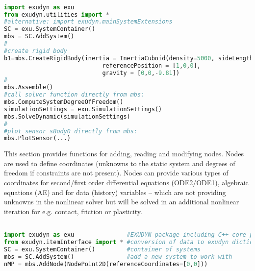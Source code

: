 \pythonstyle
\begin{lstlisting}[language=Python, firstnumber=1]

import exudyn as exu           
from exudyn.utilities import * 
#alternative: import exudyn.mainSystemExtensions
SC = exu.SystemContainer()
mbs = SC.AddSystem()
#
#create rigid body
b1=mbs.CreateRigidBody(inertia = InertiaCuboid(density=5000, sideLengths=[0.1,0.1,1]),
                            referencePosition = [1,0,0], 
                            gravity = [0,0,-9.81])
#
mbs.Assemble()
#call solver function directly from mbs:
mbs.ComputeSystemDegreeOfFreedom()
simulationSettings = exu.SimulationSettings()
mbs.SolveDynamic(simulationSettings)
#
#plot sensor sBody0 directly from mbs:
mbs.PlotSensor(...)
\end{lstlisting}




\label{sec:mainsystem:node}



This section provides functions for adding, reading and modifying nodes. Nodes are used to define coordinates (unknowns to the static system and degrees of freedom if constraints are not present). Nodes can provide various types of coordinates for second/first order differential equations (ODE2/ODE1), algebraic equations (AE) and for data (history) variables -- which are not providing unknowns in the nonlinear solver but will be solved in an additional nonlinear iteration for e.g. contact, friction or plasticity.
\pythonstyle
\begin{lstlisting}[language=Python, firstnumber=1]

import exudyn as exu               #EXUDYN package including C++ core part
from exudyn.itemInterface import * #conversion of data to exudyn dictionaries
SC = exu.SystemContainer()         #container of systems
mbs = SC.AddSystem()               #add a new system to work with
nMP = mbs.AddNode(NodePoint2D(referenceCoordinates=[0,0]))
\end{lstlisting}

